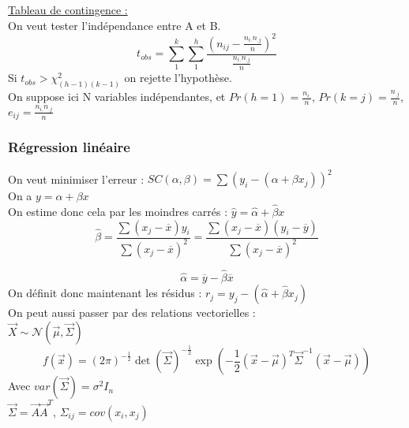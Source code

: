 \documentclass[../main.tex]{subfiles}
\begin{document}
\quad \underline{Tableau de contingence :}\\
On veut tester l'indépendance entre A et B.\\
\begin{equation}
    t_{obs} = \sum_1^k \sum_1^h \frac{(n_{ij} - \frac{n_{i.}n_{.j}}{n})^2}{\frac{n_{i.}n_{.j}}{n}}
\end{equation}
Si $t_{obs} > \chi^2_{(h-1)(k-1)}$ on rejette l'hypothèse.\\

On suppose ici N variables indépendantes, et $Pr(h=1) = \frac{n_{i.}}{n}$, $Pr(k = j) = \frac{n_{.j}}{n}$, $e_{ij} = \frac{n_{i.}n_{.j}}{n}$\\

\subsubsection{Régression linéaire}
On veut minimiser l'erreur : $SC (\alpha, \beta) = \sum (y_i - (\alpha + \beta x_j))^2$\\
On a $y = \alpha + \beta x$\\
On estime donc cela par les moindres carrés : $\hat{y} = \hat{\alpha} + \hat{\beta}x$\\
\begin{equation}
    \hat{\beta} = \frac{\sum (x_j-\overline{x})y_i}{\sum(x_j-\overline{x})^2} = \frac{\sum (x_j-\overline{x})(y_i-\overline{y})}{\sum(x_j-\overline{x})^2}
\end{equation}

\begin{equation}
    \hat{\alpha} = \overline{y}-\hat{\beta}\overline{x}
\end{equation}
On définit donc maintenant les résidus : $r_j = y_j - (\hat{\alpha} + \hat{\beta}x_j)$\\

On peut aussi passer par des relations vectorielles :\\
$\vec{X} \sim \mathcal{N}(\vec{\mu}, \vec{\Sigma})$\\
\begin{equation}
    f(\vec{x}) = (2\pi)^{-\frac{1}{2}} \det(\vec{\Sigma})^{-\frac{1}{2}} \exp{(-\frac{1}{2} (\vec{x} - \vec{\mu})^T \vec{\Sigma}^{-1}(\vec{x}-\vec{\mu}))}
\end{equation}
Avec $var(\vec{\Sigma}) = \sigma^2 I_n$\\
$\vec{\Sigma} = \vec{A} \vec{A}^T$, $\Sigma_{ij} = cov(x_i, x_j)$\\
\end{document}
